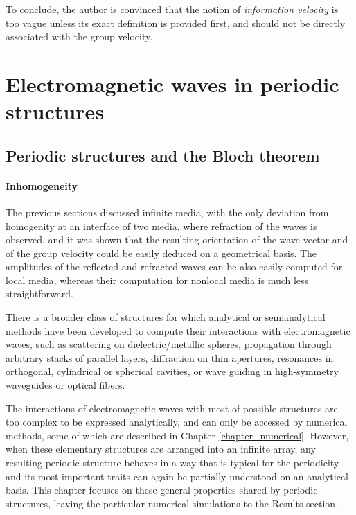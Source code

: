 To conclude, the author is convinced that the notion of \textit{information velocity} is too vague unless its exact definition is provided first, and should not be directly associated with the group velocity. 

\section{Electromagnetic waves in periodic structures}%
\subsection{Periodic structures and the Bloch theorem}
\paragraph{Inhomogeneity}%
The previous sections discussed infinite media, with the only deviation from homogenity at an interface of two media, where refraction of the waves is observed, and it was shown that the resulting orientation of the wave vector and of the group velocity could be easily deduced on a geometrical basis. The amplitudes of the reflected and refracted waves can be also easily computed for local media, whereas their computation for nonlocal media is much less straightforward. 

There is a broader class of structures for which analytical or semianalytical methods have been developed to compute their interactions with electromagnetic waves, such as scattering on dielectric/metallic spheres, propagation through arbitrary stacks of parallel layers, diffraction on thin apertures, resonances in orthogonal, cylindrical or spherical cavities, or wave guiding in high-symmetry waveguides or optical fibers. 

The interactions of electromagnetic waves with most of possible structures are too complex to be expressed analytically, and can only be accessed by numerical methods, some of which are described in Chapter \ref{chapter_numerical}. However, when these elementary structures are arranged into an infinite array, any resulting periodic structure behaves in a way that is typical for the periodicity and its most important traits can again be partially understood on an analytical basis.
This chapter focuses on these general properties shared by periodic structures, leaving the particular numerical simulations to the Results section.


